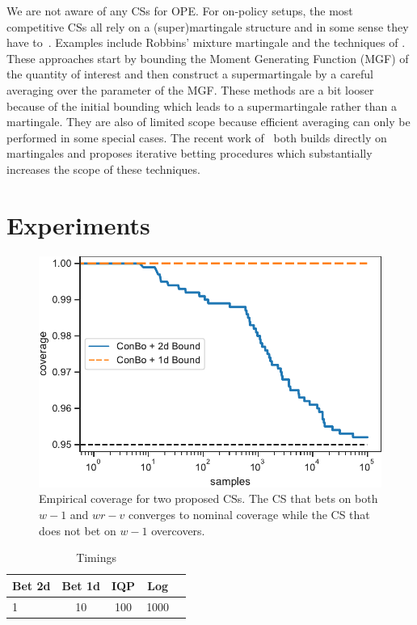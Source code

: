 We are not aware of any CSs for OPE.  For on-policy setups, the most
competitive CSs all rely on a (super)martingale structure and in some sense
they have to~\cite{ramdas2020admissible}.  Examples include Robbins' mixture
martingale \cite{robbins_statistical_1970} and the techniques of
\cite{howard_uniform_2019}. These approaches start by bounding the Moment
Generating Function (MGF) of the quantity of interest and then construct a
supermartingale by a careful averaging over the parameter of the MGF.  These
methods are a bit looser because of the initial bounding which leads to a
supermartingale rather than a martingale. They are also of limited scope
because efficient averaging can only be performed in some special cases. The
recent work of~\cite{waudby-smith_variance-adaptive_2020} both builds directly
on martingales and proposes iterative betting procedures which substantially
increases the scope of these techniques.

\section{Experiments}

\begin{figure}
    \centering
    \includegraphics[width=0.75\linewidth]{coverage}
    \caption{Empirical coverage for two proposed CSs. The CS that bets on 
    both $w-1$ and $wr-v$ converges to nominal coverage while the CS
    that does not bet on $w-1$ overcovers.}
    \label{fig:coverage}
\end{figure}

\begin{table}
\caption{Timings}
\label{tab:timings}
\centering
\begin{small}
\begin{sc}
\begin{tabular}{lcccr}
\toprule
Bet 2d & Bet 1d & IQP & Log \\
\midrule
1    &  10 & 100 & 1000 \\
\bottomrule
\end{tabular}
\end{sc}
\end{small}
\end{table}

